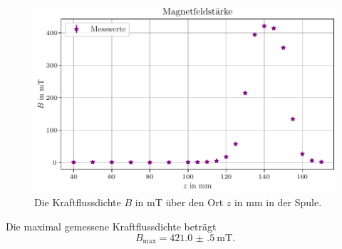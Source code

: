 \begin{figure}
    \centering
    \includegraphics[width=\textwidth]{plots/magnetfeld.pdf}
    \caption{Die Kraftflussdichte $B$ in $\si{\milli\tesla}$ über den Ort $z$ in $\si{\milli\meter}$ in der Spule.}
    \label{fig:magnetfeld}
\end{figure}
Die maximal gemessene Kraftflussdichte beträgt
\begin{equation*}
    B_\text{max} = \qty{421.0(5)}{\milli\tesla}.
\end{equation*}


